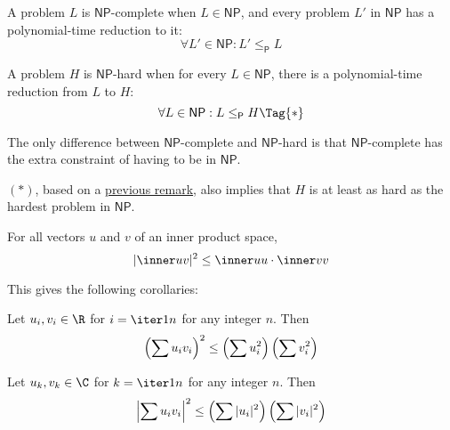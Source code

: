 A problem $L$ is $\mathsf{NP}$-complete when $L\in\mathsf{NP}$, and every
problem $L'$ in $\mathsf{NP}$ has a polynomial-time reduction to it:
$$
  \forall L'\in\mathsf{NP}: L'\leq_{\mathsf P}L
$$

A problem $H$ is $\mathsf{NP}$-hard when for every $L\in\mathsf{NP}$, there is
a polynomial-time reduction from $L$ to $H$:
\begin{equation*}
  \forall L\in\mathsf{NP}: L\leq_{\mathsf P}H\Tag{*}
\end{equation*}

The only difference between $\mathsf{NP}$-complete and $\mathsf{NP}$-hard is
that $\mathsf{NP}$-complete has the extra constraint of having to be in
$\mathsf{NP}$.

$(*)$, based on a \href{e04bcbc}{previous remark}, also implies that
$H$ is at least as hard as the hardest problem in $\mathsf{NP}$.

\label{c503127}

For all vectors $u$ and $v$ of an inner product space,
$$
  |\inner uv|^2\leq\inner uu\cdot\inner vv
$$

This gives the following corollaries:
\begin{enumerata}

  \item Let $u_i,v_i\in\R$ for $i=\iter1n$ for any integer $n$. Then
  \begin{equation*}
    \def\su{\sum}\def\u{u_i}\def\v{v_i}
    \left(\su\u\v\right)^2\leq\left(\su\u^2\right)\left(\su\v^2\right)
  \end{equation*}

  \item Let $u_k,v_k\in\C$ for $k=\iter1n$ for any integer $n$. Then
  \begin{equation*}
    \def\su{\sum}\def\u{u_i}\def\v{v_i}
    \left|\su\u\v\right|^2\leq\left(\su|\u|^2\right)\left(\su|\v|^2\right)
  \end{equation*}
\end{enumerata}

